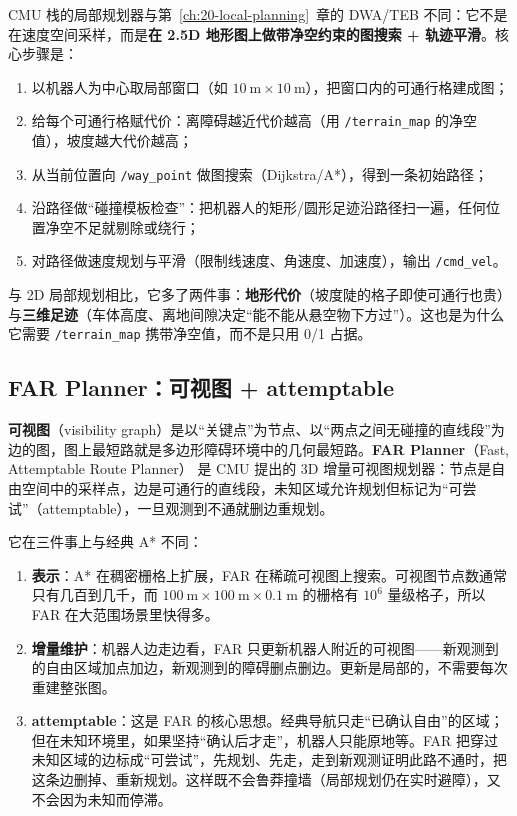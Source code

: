 CMU 栈的局部规划器与第~\ref{ch:20-local-planning}~章的 DWA/TEB 不同：它不是在速度空间采样，而是\textbf{在 2.5D 地形图上做带净空约束的图搜索 + 轨迹平滑}。核心步骤是：

\begin{enumerate}
  \item 以机器人为中心取局部窗口（如 $10\ \mathrm{m}\times10\ \mathrm{m}$），把窗口内的可通行格建成图；
  \item 给每个可通行格赋代价：离障碍越近代价越高（用 \texttt{/terrain\_map} 的净空值），坡度越大代价越高；
  \item 从当前位置向 \texttt{/way\_point} 做图搜索（Dijkstra/A*），得到一条初始路径；
  \item 沿路径做“碰撞模板检查”：把机器人的矩形/圆形足迹沿路径扫一遍，任何位置净空不足就剔除或绕行；
  \item 对路径做速度规划与平滑（限制线速度、角速度、加速度），输出 \texttt{/cmd\_vel}。
\end{enumerate}

与 2D 局部规划相比，它多了两件事：\textbf{地形代价}（坡度陡的格子即使可通行也贵）与\textbf{三维足迹}（车体高度、离地间隙决定“能不能从悬空物下方过”）。这也是为什么它需要 \texttt{/terrain\_map} 携带净空值，而不是只用 0/1 占据。

\subsection{FAR Planner：可视图 + attemptable}

\begin{definition}
\textbf{可视图}（visibility graph）是以“关键点”为节点、以“两点之间无碰撞的直线段”为边的图，图上最短路就是多边形障碍环境中的几何最短路。\textbf{FAR Planner}（Fast, Attemptable Route Planner）\cite{yang2022farplanner} 是 CMU 提出的 3D 增量可视图规划器：节点是自由空间中的采样点，边是可通行的直线段，未知区域允许规划但标记为“可尝试”（attemptable），一旦观测到不通就删边重规划。
\end{definition}

它在三件事上与经典 A* 不同：

\begin{enumerate}
  \item \textbf{表示}：A* 在稠密栅格上扩展，FAR 在稀疏可视图上搜索。可视图节点数通常只有几百到几千，而 $100\ \mathrm{m}\times100\ \mathrm{m}\times0.1\ \mathrm{m}$ 的栅格有 $10^6$ 量级格子，所以 FAR 在大范围场景里快得多。
  \item \textbf{增量维护}：机器人边走边看，FAR 只更新机器人附近的可视图——新观测到的自由区域加点加边，新观测到的障碍删点删边。更新是局部的，不需要每次重建整张图。
  \item \textbf{attemptable}：这是 FAR 的核心思想。经典导航只走“已确认自由”的区域；但在未知环境里，如果坚持“确认后才走”，机器人只能原地等。FAR 把穿过未知区域的边标成“可尝试”，先规划、先走，走到新观测证明此路不通时，把这条边删掉、重新规划。这样既不会鲁莽撞墙（局部规划仍在实时避障），又不会因为未知而停滞。
\end{enumerate}

